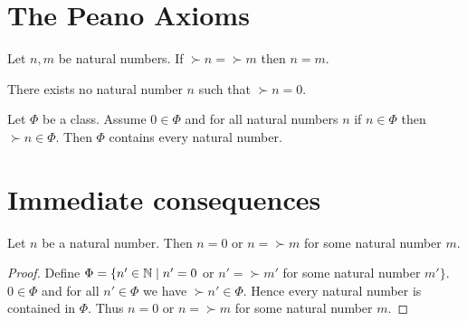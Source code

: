 \documentclass[../arithmetic.tex]{subfiles}
\begin{document}
  \section{The Peano Axioms}

  \begin{forthel}
    \begin{axiom}
      Let $n, m$ be natural numbers.
      If $\succ{n} = \succ{m}$ then $n = m$.
    \end{axiom}
  \end{forthel}

  \begin{forthel}
    \begin{axiom}
      There exists no natural number $n$ such that $\succ{n} = 0$.
    \end{axiom}
  \end{forthel}

  \begin{forthel}
    \begin{axiom}
      Let $\Phi$ be a class.
      Assume $0 \in \Phi$ and for all natural numbers $n$ if $n \in \Phi$ then
      $\succ{n} \in \Phi$.
      Then $\Phi$ contains every natural number.
    \end{axiom}
  \end{forthel}


  \section{Immediate consequences}

  \begin{forthel}
    \begin{proposition}
      Let $n$ be a natural number.
      Then $n = 0$ or $n = \succ{m}$ for some natural number $m$.
    \end{proposition}
    \begin{proof}
      Define $\Phi = \{ n' \in \mathbb{N} \mid n' = 0$ or $n' = \succ{m'}$ for some
      natural number $m' \}$.
      $0 \in \Phi$ and for all $n' \in  \Phi$ we have $\succ{n'} \in \Phi$.
      Hence every natural number is contained in $\Phi$.
      Thus $n = 0$ or $n = \succ{m}$ for some natural number $m$.
    \end{proof}
  \end{forthel}
\end{document}
